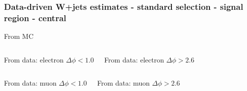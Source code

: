 \documentclass[red,compress,xcolor=table]{beamer}
\begin{document}
\begin{frame}
  \frametitle{Data-driven W+jets estimates - standard selection - signal region - central}

\vspace*{-0.5cm}
\begin{block}{\scriptsize From MC}
\begin{center}
    {\tiny
      
    }
\end{center}
  \end{block}

\vspace*{-0.2cm}
\begin{columns}
  \begin{block}{\scriptsize From data: electron $\Delta\phi<1.0$}
    {\tiny
      
    }
  \end{block}
  \begin{block}{\scriptsize From data: electron  $\Delta\phi>2.6$}
    {\tiny
      
    }
  \end{block}
\end{columns}
\begin{columns}
  \begin{block}{\scriptsize From data: muon  $\Delta\phi<1.0$}
    {\tiny
      
    }
  \end{block}
  \begin{block}{\scriptsize From data: muon $\Delta\phi>2.6$}
    {\tiny
      
    }
  \end{block}
\end{columns}


\end{frame}
\end{document}
